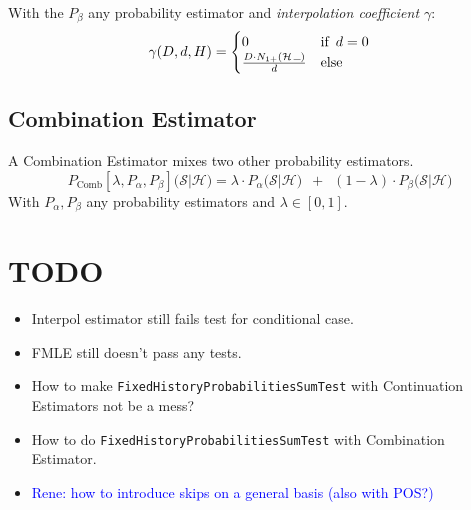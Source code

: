 \documentclass[11pt,a4paper]{article}
\newcommand{\Seq}{\mathcal{S}}
\newcommand{\Hist}{\mathcal{H}}
\newcommand{\SmallSkp}{\rule{5pt}{.3pt}}
\newcommand{\rp}[1]{\textcolor{blue}{Rene: #1}}
\begin{document}
  With the $P_\beta$ any probability estimator and
  \emph{interpolation coefficient $\gamma$}:
  \begin{equation}
    \gamma(D,d,H) = \begin{cases}
      0 & \text{if} \enspace d = 0 \\
      \frac{D \cdot N_{1+}(\Hist \, \SmallSkp)}{d} & \text{else}
    \end{cases}
  \end{equation}

  \subsection{Combination Estimator}

  A Combination Estimator mixes two other probability estimators.
  \begin{equation}
    P_\mathrm{Comb}{\scriptstyle[\lambda,P_\alpha,P_\beta]}\big(\Seq | \Hist\big) = \lambda \cdot P_\alpha\big(\Seq | \Hist\big) \enspace + \enspace (1 - \lambda) \cdot P_\beta\big(\Seq | \Hist\big)
  \end{equation}
  With $P_\alpha,P_\beta$ any probability estimators and $\lambda \in [0,1]$.

  \section{TODO}

  \begin{itemize}
    \item Interpol estimator still fails test for conditional case.
    \item FMLE still doesn't pass any tests.
    \item How to make \texttt{FixedHistoryProbabilitiesSumTest} with Continuation Estimators not be a mess?
    \item How to do \texttt{FixedHistoryProbabilitiesSumTest} with Combination Estimator.
    \item \rp{how to introduce skips on a general basis (also with POS?)}
  \end{itemize}
\end{document}
